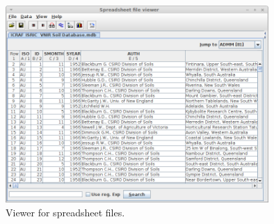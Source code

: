\documentclass[a4paper]{book}
\begin{document}
\begin{figure}[htb]
  \centering
  \includegraphics[width=10.0cm]{images/spreadsheet-viewer.png}
  \caption{Viewer for spreadsheet files.}
  \label{spreadsheet-viewer}
\end{figure}


\end{document}
